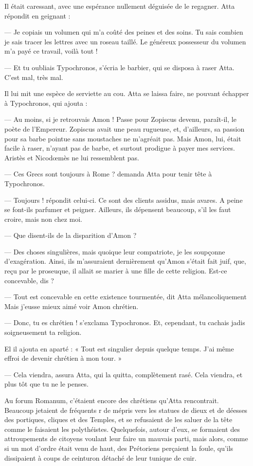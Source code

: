 \documentclass[a4paper, 11pt, oneside, polutonikogreek, french]{article}
\begin{document}
Il était caressant, avec une espérance nullement déguisée de le regagner. Atta répondit en geignant :

--- Je copiais un volumen qui m'a coûté des peines et des soins. Tu sais combien je sais tracer les lettres avec un roseau taillé. Le généreux possesseur du volumen m'a payé ce travail, voilà tout !

--- Et tu oubliais Typochronos, s'écria le barbier, qui se disposa à raser Atta. C'est mal, très mal.

Il lui mit une espèce de serviette au cou. Atta se laissa faire, ne pouvant échapper à Typochronos, qui ajouta :

--- Au moins, si je retrouvais Amon ! Passe pour Zopiscus devenu, paraît-il, le poète de l'Empereur. Zopiscus avait une peau rugueuse, et, d'ailleurs, sa passion pour sa barbe pointue sans moustaches ne m'agréait pas. Mais Amon, lui, était facile à raser, n'ayant pas de barbe, et surtout prodigue à payer mes services. Aristès et Nicodœmès ne lui ressemblent pas.

--- Ces Grecs sont toujours à Rome ? demanda Atta pour tenir tête à Typochronos.

--- Toujours ! répondit celui-ci. Ce sont des clients assidus, mais avares. A peine se font-ils parfumer et peigner. Ailleurs, ils dépensent beaucoup, s'il les faut croire, mais non chez moi.

--- Que disent-ils de la disparition d'Amon ?

--- Des choses singulières, mais quoique leur compatriote, je les soupçonne d'exagération. Ainsi, ils m'assuraient dernièrement qu'Amon s'était fait juif, que, reçu par le proseuque, il allait se marier à une fille de cette religion. Est-ce concevable, dis ?

--- Tout est concevable en cette existence tourmentée, dit Atta mélancoliquement Mais j'eusse mieux aimé voir Amon chrétien.

--- Donc, tu es chrétien ! s'exclama Typochronos. Et, cependant, tu cachais jadis soigneusement ta religion.

El il ajouta en aparté : « Tout est singulier depuis quelque temps. J'ai même effroi de devenir chrétien à mon tour. »

--- Cela viendra, assura Atta, qui la quitta, complètement rasé. Cela viendra, et plus tôt que tu ne le penses.

Au forum Romanum, c'étaient encore des chrétiens qu'Atta rencontrait. Beaucoup jetaient de fréquents r de mépris vers les statues de dieux et de déesses des portiques, cliques et des Temples, et se refusaient de les saluer de la tête comme le faisaient les polythéistes. Quelquefois, autour d'eux, se formaient des attroupements de citoyens voulant leur faire un mauvais parti, mais alors, comme si un mot d'ordre était venu de haut, des Prétoriens perçaient la foule, qu'ils dissipaient à coups de ceinturon détaché de leur tunique de cuir.
\end{document}
